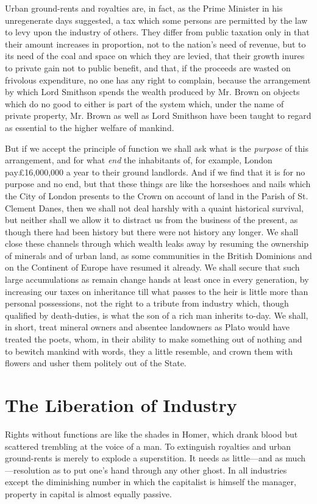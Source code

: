 \documentclass{book}
\begin{document}
Urban ground-rents and royalties are, in fact, as the Prime Minister in his unregenerate days suggested, a tax which some persons are permitted by the law to levy upon the industry of others. They differ from public taxation only in that their amount increases in proportion, not to the nation’s need of revenue, but to its need of the coal and space on which they are levied, that their growth inures to private gain not to public benefit, and that, if the proceeds are wasted on frivolous expenditure, no one has any right to complain, because the arrangement by which Lord Smithson spends the wealth produced by Mr. Brown on objects which do no good to either is part of the system which, under the name of private property, Mr. Brown as well as Lord Smithson have been taught to regard as essential to the higher welfare of mankind.

But if we accept the principle of function we shall ask what is the \emph{purpose} of this arrangement, and for what \emph{end} the inhabitants of, for example, London pay£16,000,000 a year to their ground landlords. And if we find that it is for no purpose and no end, but that these things are like the horseshoes and nails which the City of London presents to the Crown on account of land in the Parish of St. Clement Danes, then we shall not deal harshly with a quaint historical survival, but neither shall we allow it to distract us from the business of the present, as though there had been history but there were not history any longer. We shall close these channels through which wealth leaks away by resuming the ownership of minerals and of urban land, as some communities in the British Dominions and on the Continent of Europe have resumed it already. We shall secure that such large accumulations as remain change hands at least once in every generation, by increasing our taxes on inheritance till what passes to the heir is little more than personal possessions, not the right to a tribute from industry which, though qualified by death-duties, is what the son of a rich man inherits to-day. We shall, in short, treat mineral owners and absentee landowners as Plato would have treated the poets, whom, in their ability to make something out of nothing and to bewitch mankind with words, they a little resemble, and crown them with flowers and usher them politely out of the State.

\chapter{The Liberation of Industry}
\label{chapter-6}
Rights without functions are like the shades in Homer, which drank blood but scattered trembling at the voice of a man. To extinguish royalties and urban ground-rents is merely to explode a superstition. It needs as little—and as much—resolution as to put one’s hand through any other ghost. In all industries except the diminishing number in which the capitalist is himself the manager, property in capital is almost equally passive.
\end{document}
